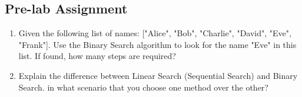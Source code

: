 \subsection{Pre-lab Assignment}
\begin{enumerate}
    \item Given the following list of names: ["Alice", "Bob", "Charlie", "David", "Eve", "Frank"].
    Use the Binary Search algorithm to look for the name "Eve" in this list. If found, how many steps are required?
    \item Explain the difference between Linear Search (Sequential Search) and Binary Search.
    in what scenario that you choose one method over the other?
\end{enumerate}
